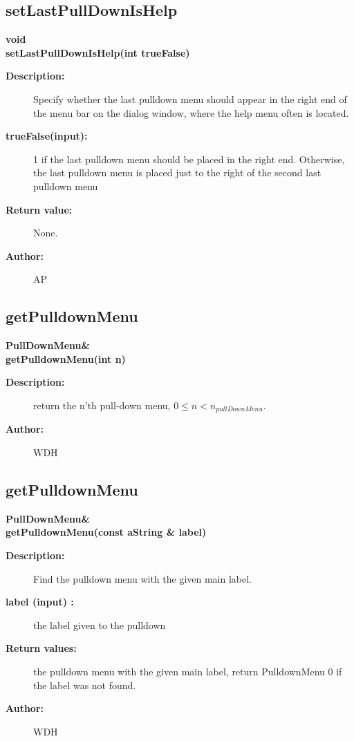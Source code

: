 \subsection{setLastPullDownIsHelp}
 
\begin{flushleft} \textbf{%
void  \\ 
\settowidth{\DialogDataIncludeArgIndent}{setLastPullDownIsHelp(}%
setLastPullDownIsHelp(int trueFalse)
}\end{flushleft}
\begin{description}
\item[{\bf Description:}]  Specify whether the last pulldown menu should appear in the
 right end of the menu bar on the dialog window, where the help menu often is
 located.
\item[{\bf trueFalse(input):}]  1 if the last pulldown menu should be placed in the right end. 
  Otherwise, the last pulldown menu is placed just to the right of the second last 
  pulldown menu 
\item[{\bf Return value:}]  None.
\item[{\bf Author:}]  AP
\end{description}
\subsection{getPulldownMenu}
 
\begin{flushleft} \textbf{%
PullDownMenu\&  \\ 
\settowidth{\DialogDataIncludeArgIndent}{getPulldownMenu(}%
getPulldownMenu(int n)
}\end{flushleft}
\begin{description}
\item[{\bf Description:}]  
    return the n'th pull-down menu, $0 \leq n < n_{pullDownMenu}$.
\item[{\bf Author:}]  WDH
\end{description}
\subsection{getPulldownMenu}
 
\begin{flushleft} \textbf{%
PullDownMenu\&  \\ 
\settowidth{\DialogDataIncludeArgIndent}{getPulldownMenu(}%
getPulldownMenu(const aString \& label)
}\end{flushleft}
\begin{description}
\item[{\bf Description:}]  
    Find the pulldown menu with the given main label.
\item[{\bf label (input) :}]  the label given to the pulldown
\item[{\bf Return values:}]  the pulldown menu with the given main label, return PulldownMenu 0
 if the label was not found.
\item[{\bf Author:}]  WDH
\end{description}
